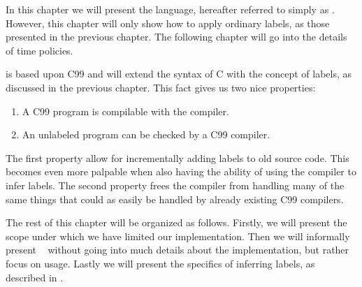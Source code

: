 
In this chapter we will present the \thelanglong{} language, hereafter referred to simply as \thelang.
However, this chapter will only show how to apply ordinary labels, as those presented in the previous chapter.
The following chapter will go into the details of time policies.

\thelang{} is based upon C99 and will extend the syntax of C with the concept of labels, as discussed in the previous chapter.
This fact gives us two nice properties:
\begin{enumerate}
  \item A C99 program is compilable with the \thelang{} compiler.
  \item An unlabeled \thelang{} program can be checked by a C99 compiler.
\end{enumerate}
The first property allow for incrementally adding labels to old source code.
This becomes even more palpable when also having the ability of using the \thelang{} compiler to infer labels.
The second property frees the \thelang{} compiler from handling many of the same things that could as easily be handled by already existing C99 compilers.

The rest of this chapter will be organized as follows.
Firstly, we will present the scope under which we have limited our implementation.
Then we will informally present \thelang~ without going into much details about the implementation, but rather focus on usage.
Lastly we will present the specifics of inferring labels, as described in .
